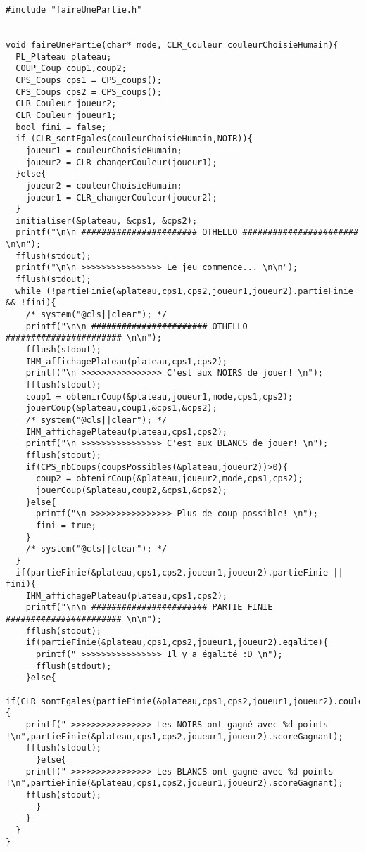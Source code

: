 \begin{lstlisting}
#include "faireUnePartie.h"


void faireUnePartie(char* mode, CLR_Couleur couleurChoisieHumain){
  PL_Plateau plateau;
  COUP_Coup coup1,coup2;
  CPS_Coups cps1 = CPS_coups();
  CPS_Coups cps2 = CPS_coups();
  CLR_Couleur joueur2;
  CLR_Couleur joueur1;
  bool fini = false;
  if (CLR_sontEgales(couleurChoisieHumain,NOIR)){
    joueur1 = couleurChoisieHumain;
    joueur2 = CLR_changerCouleur(joueur1);
  }else{
    joueur2 = couleurChoisieHumain;
    joueur1 = CLR_changerCouleur(joueur2);    
  }
  initialiser(&plateau, &cps1, &cps2);
  printf("\n\n ####################### OTHELLO ####################### \n\n");
  fflush(stdout);
  printf("\n\n >>>>>>>>>>>>>>>> Le jeu commence... \n\n");
  fflush(stdout);
  while (!partieFinie(&plateau,cps1,cps2,joueur1,joueur2).partieFinie && !fini){
    /* system("@cls||clear"); */
    printf("\n\n ####################### OTHELLO ####################### \n\n");
    fflush(stdout);
    IHM_affichagePlateau(plateau,cps1,cps2);
    printf("\n >>>>>>>>>>>>>>>> C'est aux NOIRS de jouer! \n");
    fflush(stdout);
    coup1 = obtenirCoup(&plateau,joueur1,mode,cps1,cps2);
    jouerCoup(&plateau,coup1,&cps1,&cps2);
    /* system("@cls||clear"); */
    IHM_affichagePlateau(plateau,cps1,cps2);
    printf("\n >>>>>>>>>>>>>>>> C'est aux BLANCS de jouer! \n");
    fflush(stdout);
    if(CPS_nbCoups(coupsPossibles(&plateau,joueur2))>0){
      coup2 = obtenirCoup(&plateau,joueur2,mode,cps1,cps2);
      jouerCoup(&plateau,coup2,&cps1,&cps2);
    }else{
      printf("\n >>>>>>>>>>>>>>>> Plus de coup possible! \n");
      fini = true;
    }
    /* system("@cls||clear"); */
  }
  if(partieFinie(&plateau,cps1,cps2,joueur1,joueur2).partieFinie || fini){
    IHM_affichagePlateau(plateau,cps1,cps2);
    printf("\n\n ####################### PARTIE FINIE  ####################### \n\n");
    fflush(stdout);
    if(partieFinie(&plateau,cps1,cps2,joueur1,joueur2).egalite){
      printf(" >>>>>>>>>>>>>>>> Il y a égalité :D \n");
      fflush(stdout);
    }else{
      if(CLR_sontEgales(partieFinie(&plateau,cps1,cps2,joueur1,joueur2).couleurGagnant,NOIR)){
	printf(" >>>>>>>>>>>>>>>> Les NOIRS ont gagné avec %d points !\n",partieFinie(&plateau,cps1,cps2,joueur1,joueur2).scoreGagnant);
	fflush(stdout);
      }else{
	printf(" >>>>>>>>>>>>>>>> Les BLANCS ont gagné avec %d points !\n",partieFinie(&plateau,cps1,cps2,joueur1,joueur2).scoreGagnant);
	fflush(stdout);
      }
    }
  }
}
\end{lstlisting}

